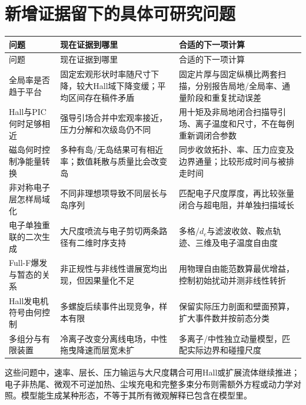 \documentclass[UTF8,a4paper,11pt,openany,fontset=fandol]{ctexbook}
\begin{document}
\section{新增证据留下的具体可研究问题}
\begin{longtable}{P{36mm}P{67mm}P{46mm}}
\toprule 问题 & 现在证据到哪里 & 合适的下一项计算\\\midrule\endfirsthead
\toprule 问题 & 现在证据到哪里 & 合适的下一项计算\\\midrule\endhead
全局率是否趋于平台 & 固定宏观形状时率随尺寸下降，较大Hall域下降变缓；平均区间存在稿件矛盾\citep{F600} & 固定片厚与固定纵横比两套扫描，分别报告局地/全局率、通量阶段和重复扰动误差\\
Hall与PIC何时足够相近 & 强导引场合并中宏观率接近，压力分解和次级岛仍不同\citep{L241} & 用十矩及非局地闭合扫描导引场、离子温度和尺寸，不在每例重新调闭合参数\\
磁岛何时控制净能量转换 & 多种有岛/无岛结果可有相近率；数值耗散与质量比会改变岛\citep{F606,F788} & 同步收敛拓扑、率、压力应变及边界通量；比较形成时间与被排走时间\\
非对称电子层怎样局域化 & 不同非理想项导致不同层长与岛序列\citep{F625} & 匹配电子尺度厚度，再比较张量闭合与超电阻，并单独扫描域长\\
电子单独重联的二次生成 & 大尺度喷流与电子剪切两条路径有二维时序支持\citep{F655} & 多格/$d_e$与滤波收敛、鞍点轨迹、三维及电子温度自由度\\
Full-F爆发与暂态的关系 & 非正规性与非线性谱展宽均出现，但因果量化不足\citep{L314} & 用物理自由能范数算最优增益，控制初始扰动并测非线性转折\\
Hall发电机符号由何控制 & 多螺旋后续事件出现竞争，样本有限\citep{F798} & 保留实际压力剖面和壁面预算，扩大事件数并按前态分类\\
多组分与有限装置 & 冷离子改变分离线电场，中性拖曳降速而层宽未扩\citep{L227,L190} & 多离子/中性独立动量模型，匹配实际边界和碰撞尺度\\
\bottomrule
\end{longtable}

这些问题中，速率、层长、压力输运与大尺度耦合可用Hall或扩展流体继续推进；电子非热尾、微观不可逆加热、尘埃充电和完整多束分布则需额外方程或动力学对照。模型能生成某种形态，不等于其所有微观解释已包含在模型里。
\end{document}
